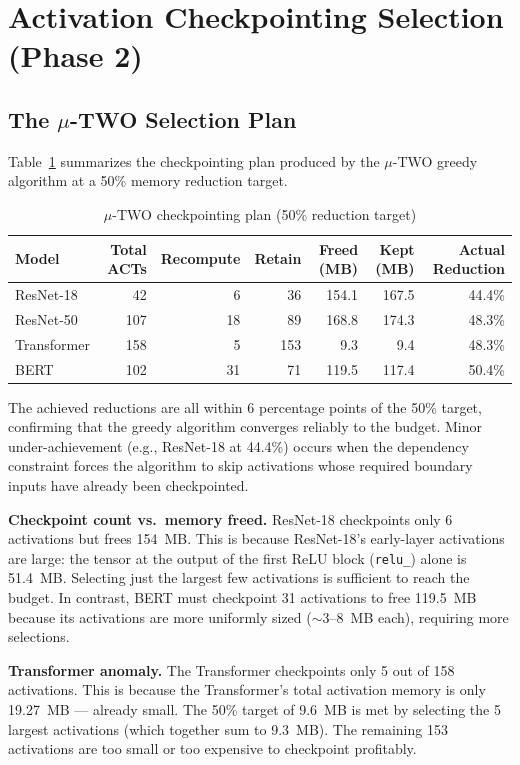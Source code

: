 \documentclass[11pt]{article}
\begin{document}
\section{Activation Checkpointing Selection (Phase 2)}

\subsection{The $\mu$-TWO Selection Plan}

Table~\ref{tab:acplan} summarizes the checkpointing plan produced by the
$\mu$-TWO greedy algorithm at a 50\% memory reduction target.

\begin{table}[H]
\centering
\caption{$\mu$-TWO checkpointing plan (50\% reduction target)}
\label{tab:acplan}
\begin{tabular}{lrrrrrr}
\toprule
\textbf{Model} & \textbf{Total ACTs} & \textbf{Recompute} & \textbf{Retain}
  & \textbf{Freed (MB)} & \textbf{Kept (MB)} & \textbf{Actual Reduction} \\
\midrule
ResNet-18   & 42  &  6 & 36 & 154.1 & 167.5 & 44.4\% \\
ResNet-50   & 107 & 18 & 89 & 168.8 & 174.3 & 48.3\% \\
Transformer & 158 &  5 & 153 &  9.3 &   9.4 & 48.3\% \\
BERT        & 102 & 31 & 71 & 119.5 & 117.4 & 50.4\% \\
\bottomrule
\end{tabular}
\end{table}

The achieved reductions are all within 6 percentage points of the 50\%
target, confirming that the greedy algorithm converges reliably to the
budget. Minor under-achievement (e.g., ResNet-18 at 44.4\%) occurs when
the dependency constraint forces the algorithm to skip activations whose
required boundary inputs have already been checkpointed.

\textbf{Checkpoint count vs.\ memory freed.} ResNet-18 checkpoints only 6
activations but frees 154~MB. This is because ResNet-18's early-layer
activations are large: the tensor at the output of the first ReLU block
(\texttt{relu\_}) alone is 51.4~MB. Selecting just the largest few
activations is sufficient to reach the budget. In contrast, BERT must
checkpoint 31 activations to free 119.5~MB because its activations are
more uniformly sized ($\sim$3--8~MB each), requiring more selections.

\textbf{Transformer anomaly.} The Transformer checkpoints only 5 out of
158 activations. This is because the Transformer's total activation memory
is only 19.27~MB --- already small. The 50\% target of 9.6~MB is met by
selecting the 5 largest activations (which together sum to 9.3~MB). The
remaining 153 activations are too small or too expensive to checkpoint
profitably.
\end{document}
